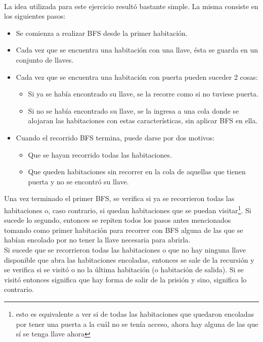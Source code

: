 \paragraph{}
La idea utilizada para este ejercicio resultó bastante simple. La misma consiste en los siguientes pasos:
\begin{itemize}
	\item Se comienza a realizar BFS desde la primer habitación.
	\item Cada vez que se encuentra una habitación con una llave, ésta se guarda en un conjunto de llaves.
	\item Cada vez que se encuentra una habitación con puerta pueden suceder 2 cosas:
	\begin{itemize}
		\item Si ya se había encontrado su llave, se la recorre como si no tuviese puerta.
		\item Si no se había encontrado su llave, se la ingresa a una cola donde se alojaran las habitaciones con estas características, sin aplicar BFS en ella.
	\end{itemize}
	\item Cuando el recorrido BFS termina, puede darse por dos motivos:
	\begin{itemize}
		\item Que se hayan recorrido todas las habitaciones.
		\item Que queden habitaciones sin recorrer en la cola de aquellas que tienen puerta y no se encontró su llave.
	\end{itemize}
\end{itemize}

Una vez terminado el primer BFS, se verifica si ya se recorrieron todas las habitaciones o, caso contrario, si quedan habitaciones que se puedan visitar\footnote{esto es equivalente a ver si de todas las habitaciones que quedaron encoladas por tener una puerta a la cuál no se tenía acceso, ahora hay alguna de las que sí se tenga llave ahora}. Si sucede lo segundo, entonces se repiten todos los pasos antes mencionados tomando como primer habitación para recorrer con BFS alguna de las que se habían encolado por no tener la llave necesaria para abrirla.\\
Si sucede que se recorrieron todas las habitaciones o que no hay ninguna llave disponible que abra las habitaciones encoladas, entonces se sale de la recursión y se verifica si se visitó o no la última habitación (o habitación de salida). Si se visitó entonces significa que hay forma de salir de la prisión y sino, significa lo contrario.


